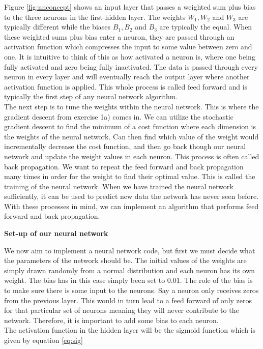 \documentclass[12pt,a4paper]{article}
\begin{document}
\noindent Figure \ref{fig:nnconcept} shows an input layer that passes a weighted sum plus bias to the three neurons in the first hidden layer. The weights $W_1, W_2$ and $W_3$ are typically different while the biases $B_1, B_2$ and $B_3$ are typically the equal. When these weighted sums plus bias enter a neuron, they are passed through an activation function which compresses the input to some value between zero and one. It is intuitive to think of this as how activated a neuron is, where one being fully activated and zero being fully inactivated. The data is passed through every neuron in every layer and will eventually reach the output layer where another activation function is applied. This whole process is called feed forward and is typically the first step of any neural network algorithm.
\\
The next step is to tune the weights within the neural network. This is where the gradient descent from exercise 1a) comes in. We can utilize the stochastic gradient descent to find the minimum of a cost function where each dimension is the weights of the neural network. Can then find which value of the weight would incrementally decrease the cost function, and then go back though our neural network and update the weight values in each neuron. This process is often called back propagation. We want to repeat the feed forward and back propagation many times in order for the weight to find their optimal value. This is called the training of the neural network. When we have trained the neural network sufficiently, it can be used to predict new data the network has never seen before. With these processes in mind, we can implement an algorithm that performs feed forward and back propagation.

\begin{center}
\large{\textbf{Set-up of our neural network}}
\end{center}

\noindent We now aim to implement a neural network code, but first we must decide what the parameters of the network should be. The initial values of the weights are simply drawn randomly from a normal distribution and each neuron has its own weight. The bias has in this case simply been set to $0.01$. The role of the bias is to make sure there is some input to the neurons. Say a neuron only receives zeros from the previous layer. This would in turn lead to a feed forward of only zeros for that particular set of neurons meaning they will never contribute to the network. Therefore, it is important to add some bias to each neuron. 
\\
The activation function in the hidden layer will be the sigmoid function which is given by equation \ref{eq:sig}
\end{document}
